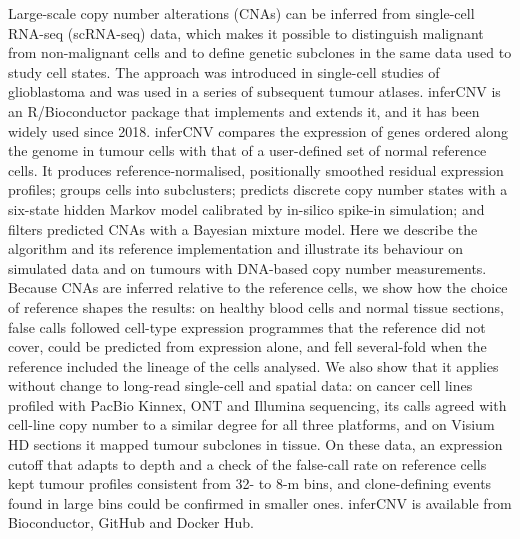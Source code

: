 Large-scale copy number alterations (CNAs) can be inferred from single-cell RNA-seq (scRNA-seq) data, which makes it possible to distinguish malignant from non-malignant cells and to define genetic subclones in the same data used to study cell states. The approach was introduced in single-cell studies of glioblastoma and was used in a series of subsequent tumour atlases. inferCNV is an R/Bioconductor package that implements and extends it, and it has been widely used since 2018. inferCNV compares the expression of genes ordered along the genome in tumour cells with that of a user-defined set of normal reference cells. It produces reference-normalised, positionally smoothed residual expression profiles; groups cells into subclusters; predicts discrete copy number states with a six-state hidden Markov model calibrated by in-silico spike-in simulation; and filters predicted CNAs with a Bayesian mixture model. Here we describe the algorithm and its reference implementation and illustrate its behaviour on simulated data and on tumours with DNA-based copy number measurements. Because CNAs are inferred relative to the reference cells, we show how the choice of reference shapes the results: on healthy blood cells and normal tissue sections, false calls followed cell-type expression programmes that the reference did not cover, could be predicted from expression alone, and fell several-fold when the reference included the lineage of the cells analysed. We also show that it applies without change to long-read single-cell and spatial data: on cancer cell lines profiled with PacBio Kinnex, ONT and Illumina sequencing, its calls agreed with cell-line copy number to a similar degree for all three platforms, and on Visium HD sections it mapped tumour subclones in tissue. On these data, an expression cutoff that adapts to depth and a check of the false-call rate on reference cells kept tumour profiles consistent from 32- to 8-\textmu m bins, and clone-defining events found in large bins could be confirmed in smaller ones. inferCNV is available from Bioconductor, GitHub and Docker Hub.
